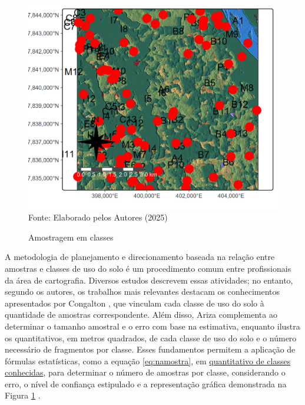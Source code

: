 	\begin{figure}
		\begin{center}
			\centering  \small \caption{Amostragem em classes}
			\includegraphics[width=0.97\linewidth]{FIGURAS/usoSOLOamostras}
			\label{fig:usoSOLOamostras}\\{ Fonte:   Elaborado pelos Autores (2025)}
		\end{center}
	\end{figure} 
	\hspace*{1.25 cm} A metodologia de planejamento e direcionamento baseada na relação entre amostras e classes de uso do solo é um procedimento comum entre profissionais da área de cartografia. Diversos estudos descrevem essas atividades; no entanto, segundo os autores, os trabalhos mais relevantes destacam os conhecimentos apresentados por Congalton \cite[p.79]{Congalton}, que vinculam cada classe de uso do solo à quantidade de amostras correspondente. Além disso, Ariza \cite[p.135]{Ariza} complementa ao determinar o tamanho amostral e o erro com base na estimativa, enquanto \cite[p.192-196]{Ariza} ilustra os quantitativos, em metros quadrados, de cada classe de uso do solo e o número necessário de fragmentos por classe. Esses fundamentos permitem a aplicação de fórmulas estatísticas, como a equação \eqref{eq:namostra}, em \underline{quantitativo de classes conhecidas},  para determinar o número de amostras por classe, considerando o erro, o nível de confiança estipulado e a representação gráfica demonstrada na Figura \ref{fig:usoSOLOamostras}  .\\
		
